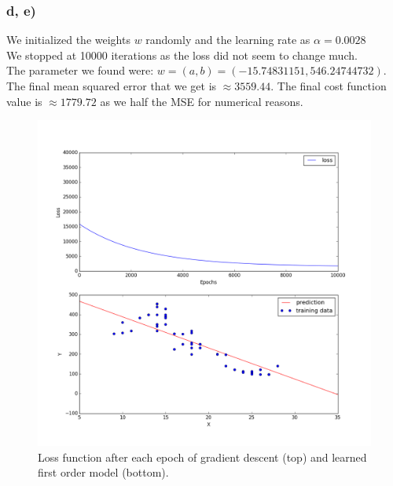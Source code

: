 \documentclass{article}
\begin{document}
\subsubsection*{d, e)}
We initialized the weights $w$ randomly and the learning rate as $\alpha = 0.0028$\\
We stopped at 10000 iterations as the loss did not seem to change much.\\
The parameter we found were: $w = (a, b) = (-15.74831151,  546.24744732)$.
The final mean squared error that we get is $\approx 3559.44$.
The final cost function value is $\approx 1779.72$ as we half the MSE for numerical reasons.
\begin{figure}[H]
	\centering
	\includegraphics[scale=0.3]{31de.png}
	\caption{Loss function after each epoch of gradient descent (top) and learned first order model (bottom).}
	\label{fig2}
\end{figure}
\end{document}
